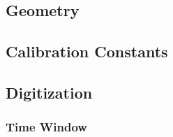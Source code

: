 \section{}


\subsection{Geometry}

\subsection{Calibration Constants}


\subsection{Digitization}

\subsubsection{Time Window}



